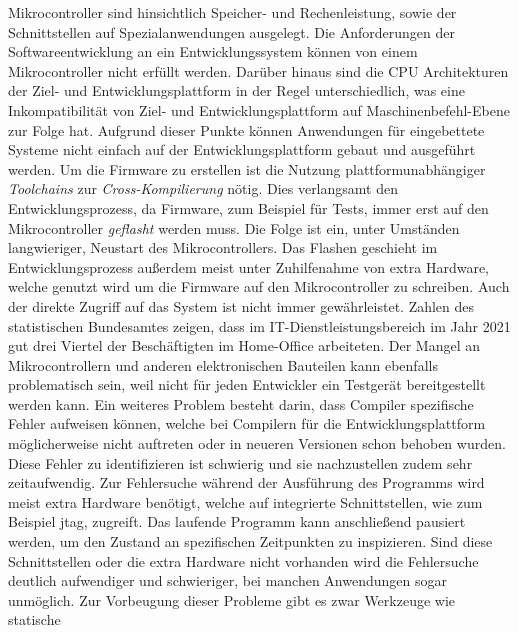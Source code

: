 Mikrocontroller sind hinsichtlich Speicher- und Rechenleistung, sowie der
Schnittstellen auf Spezialanwendungen ausgelegt.
Die Anforderungen der Softwareentwicklung an ein Entwicklungssystem können
von einem Mikrocontroller nicht erfüllt werden.
Darüber hinaus sind die CPU Architekturen der Ziel- und Entwicklungsplattform
in der Regel unterschiedlich, was eine Inkompatibilität von Ziel- und
Entwicklungsplattform auf Maschinenbefehl-Ebene zur Folge hat.\newline
Aufgrund dieser Punkte können Anwendungen für eingebettete Systeme nicht
einfach auf der Entwicklungsplattform gebaut und ausgeführt werden.
Um die Firmware zu erstellen ist die Nutzung plattformunabhängiger
\textit{Toolchains} zur \textit{Cross-Kompilierung} nötig.
Dies verlangsamt den Entwicklungsprozess, da Firmware, zum Beispiel für Tests,
immer erst auf den Mikrocontroller \textit{geflasht} werden muss.
Die Folge ist ein, unter Umständen langwieriger, Neustart des Mikrocontrollers.
Das Flashen geschieht im Entwicklungsprozess außerdem meist unter Zuhilfenahme
von extra Hardware, welche genutzt wird um die Firmware auf den Mikrocontroller
zu schreiben.\newline
Auch der direkte Zugriff auf das System ist nicht immer gewährleistet.
Zahlen des statistischen Bundesamtes zeigen, dass im IT-Dienstleistungsbereich
im Jahr 2021 gut drei Viertel der Beschäftigten im Home-Office
arbeiteten\cite{DestatisHomeOffice}.
Der Mangel an Mikrocontrollern und anderen elektronischen Bauteilen kann
ebenfalls problematisch sein, weil nicht für jeden Entwickler ein Testgerät
bereitgestellt werden kann.\newline
Ein weiteres Problem besteht darin, dass Compiler spezifische Fehler aufweisen
können, welche bei Compilern für die Entwicklungsplattform möglicherweise nicht
auftreten\cite{DebGccBug}\cite{LaunchpadGccBug} oder in neueren Versionen schon
behoben wurden.
Diese Fehler zu identifizieren ist schwierig und sie nachzustellen zudem
sehr zeitaufwendig.\newline
Zur Fehlersuche während der Ausführung des Programms wird meist extra Hardware
benötigt, welche auf integrierte Schnittstellen, wie zum Beispiel
\acs{jtag}, zugreift.
Das laufende Programm kann anschließend pausiert werden, um den Zustand an
spezifischen Zeitpunkten zu inspizieren.
Sind diese Schnittstellen oder die extra Hardware nicht vorhanden wird die
Fehlersuche deutlich aufwendiger und schwieriger, bei manchen Anwendungen sogar
unmöglich.
Zur Vorbeugung dieser Probleme gibt es zwar Werkzeuge wie statische
